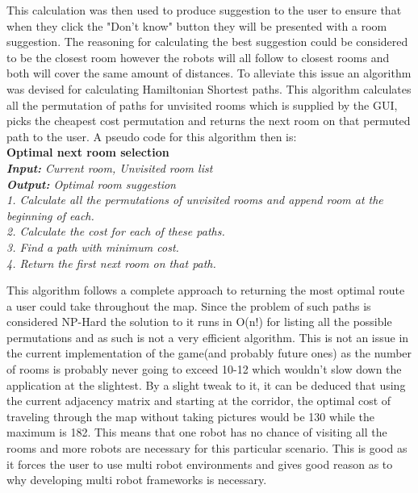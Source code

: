       This calculation was then used to produce suggestion to the user to ensure that when they click the "Don't know" button they will be presented with a room suggestion. The reasoning for calculating the best suggestion could be considered to be the closest room however the robots will all follow to closest rooms and both will cover the same amount of distances. To alleviate this issue an algorithm was devised for calculating Hamiltonian Shortest paths. This algorithm calculates all the permutation of paths for unvisited rooms which is supplied by the GUI, picks the cheapest cost permutation and returns the next room on that permuted path to the user. A pseudo code for this algorithm then is:\\
      \textbf{Optimal next room selection}\\
      \emph{
        \textbf{Input: } Current room, Unvisited room list\\
        \textbf{Output: } Optimal room suggestion\\
        1. Calculate all the permutations of unvisited rooms and append room at the beginning of each.\\
        2. Calculate the cost for each of these paths.\\
        3. Find a path with minimum cost.\\
        4. Return the first next room on that path.\\
      }

      This algorithm follows a complete approach to returning the most optimal route a user could take throughout the map. Since the problem of such paths is considered NP-Hard\cite{TSP} the solution to it runs in O(n!) for listing all the possible permutations and as such is not a very efficient algorithm. This is not an issue in the current implementation of the game(and probably future ones) as the number of rooms is probably never going to exceed 10-12 which wouldn't slow down the application at the slightest. By a slight tweak to it, it can be deduced that using the current adjacency matrix and starting at the corridor, the optimal cost of traveling through the map without taking pictures would be 130 while the maximum is 182. This means that one robot has no chance of visiting all the rooms and more robots are necessary for this particular scenario. This is good as it forces the user to use multi robot environments and gives good reason as to why developing multi robot frameworks is necessary.

